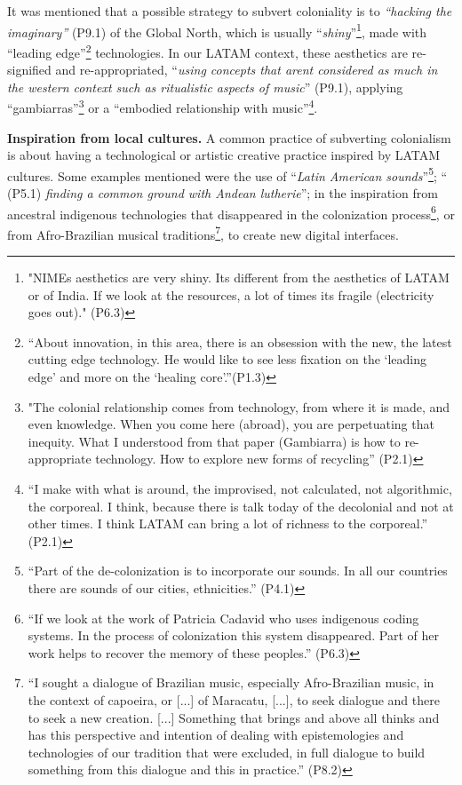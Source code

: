 \documentclass[sigconf]{nimeart}
\begin{document}
It was mentioned that a possible strategy to subvert coloniality is to \emph{``hacking the imaginary''} (P9.1) of the Global North, which is usually ``\emph{shiny}''\footnote{"NIME\textquotesingle s aesthetics are very shiny. It\textquotesingle s different from the aesthetics of LATAM or of India. If we look at the resources, a lot of times it\textquotesingle s fragile (electricity goes out)." (P6.3)}, made with ``leading edge''\footnote{``About innovation, in this area, there is an obsession with the new, the latest cutting edge technology. He would like to see less fixation on the `leading edge' and more on the `healing core'.''(P1.3)} technologies. In our LATAM context, these aesthetics are re-signified and re-appropriated, ``\emph{using concepts that aren\textquotesingle t considered as much in the western context such as ritualistic aspects of music}'' (P9.1), applying ``gambiarras''\footnote{"The colonial relationship comes from technology, from where it is made, and even knowledge. When you come here (abroad), you are perpetuating that inequity. What I understood from that paper (Gambiarra) is how to re-appropriate technology. How to explore new forms of recycling'' (P2.1)} or a ``embodied relationship with music''\footnote{``I make with what is around, the improvised, not calculated, not algorithmic, the corporeal. I think, because there is talk today of the decolonial and not at other times. I think LATAM can bring a lot of richness to the corporeal.'' (P2.1)}.

\textbf{Inspiration from local cultures.} A common practice of subverting colonialism is about having a technological or artistic creative practice inspired by LATAM cultures. Some examples mentioned were the use of ``\emph{Latin American sounds}''\footnote{``Part of the de-colonization is to incorporate our sounds. In all our countries there are sounds of our cities, ethnicities.'' (P4.1)}; `` \textbf{\emph{}} (P5.1) \emph{finding a common ground with Andean lutherie}''; in the inspiration from ancestral indigenous technologies that disappeared in the colonization process\footnote{``If we look at the work of Patricia Cadavid who uses indigenous coding systems. In the process of colonization this system disappeared. Part of her work helps to recover the memory of these peoples.'' (P6.3)}, or from Afro-Brazilian musical traditions\footnote{``I sought a dialogue of Brazilian music, especially Afro-Brazilian music, in the context of capoeira, or {[}...{]} of Maracatu, {[}...{]}, to seek dialogue and there to seek a new creation. {[}...{]} Something that brings and above all thinks and has this perspective and intention of dealing with epistemologies and technologies of our tradition that were excluded, in full dialogue to build something from this dialogue and this in practice.'' (P8.2)}, to create new digital interfaces.
\end{document}
